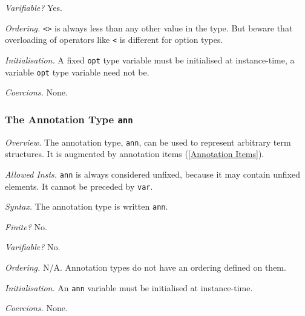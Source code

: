 \documentclass[10pt]{scrartcl}
\newcommand{\TyThing}[1]{\vspace{1.2mm}\noindent\emph{#1} }
\newcommand{\TyOverview}{\TyThing{Overview.}}
\newcommand{\TyInsts}{\TyThing{Allowed Insts.}}
\newcommand{\TySyntax}{\TyThing{Syntax.}}
\newcommand{\TyFiniteType}{\TyThing{Finite?}}
\newcommand{\TyVarifiable}{\TyThing{Varifiable?}}
\newcommand{\TyOrdering}{\TyThing{Ordering.}}
\newcommand{\TyInit}{\TyThing{Initialisation.}}
\newcommand{\TyCoercions}{\TyThing{Coercions.}}
\begin{document}
\TyVarifiable
Yes.

\TyOrdering
\texttt{<>} is always less than any other value in the type.
But beware that overloading of operators like \texttt{<} is different for
option types.

\TyInit
A fixed \texttt{opt} type variable must be initialised at instance-time,
a variable \texttt{opt} type variable need not be.

\TyCoercions
None.

\subsubsection{The Annotation Type \texttt{ann}}
     \label{the annotation type}
\TyOverview
The annotation type, \texttt{ann}, can be used to represent arbitrary term
structures.  It is augmented by annotation items (\ref{Annotation Items}).

\TyInsts
\texttt{ann} is always considered unfixed, because it may contain unfixed
elements.  It cannot be preceded by \texttt{var}.

\TySyntax
The annotation type is written \texttt{ann}.

\TyFiniteType
No.

\TyVarifiable
No.

\TyOrdering
N/A.  Annotation types do not have an ordering defined on them.

\TyInit
An \texttt{ann} variable must be initialised at instance-time.

\TyCoercions
None.
\end{document}
